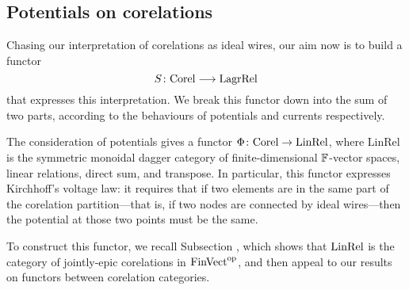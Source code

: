 \subsection{Potentials on corelations} \label{ssec:potentialsoncorelations}

Chasing our interpretation of corelations as ideal wires, our aim now is to
build a functor
\[
  S{\colon} \mathrm{Corel} \longrightarrow \mathrm{LagrRel}
\]
that expresses this interpretation. We break this functor down into the sum 
of two parts, according to the behaviours of potentials and currents
respectively. 

The consideration of potentials gives a functor $\Phi{\colon} \mathrm{Corel}
\to \mathrm{LinRel}$, where $\mathrm{LinRel}$ is the symmetric
monoidal dagger category of finite-dimensional ${\mathbb F}$-vector spaces, linear
relations, direct sum, and transpose. In particular, this functor expresses
Kirchhoff's voltage law: it requires that if two elements are in the same part
of the corelation partition---that is, if two nodes are connected by ideal
wires---then the potential at those two points must be the same.

To construct this functor, we recall Subsection , which shows that
$\mathrm{LinRel}$ is the category of jointly-epic corelations in $\mathrm{FinVect}^{\mathrm{op}}$, and
then appeal to our results on functors between corelation categories.

